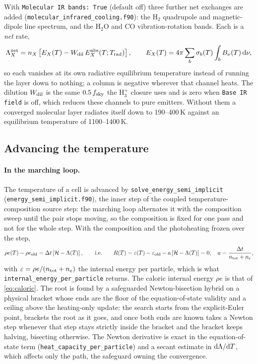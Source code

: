 With \texttt{Molecular IR bands: True} (default off) three further net
exchanges are added (\texttt{molecular\_infrared\_cooling.f90}): the H$_2$
quadrupole and magnetic-dipole line spectrum, and the H$_2$O and CO
vibration-rotation bands. Each is a \emph{net} rate,
\begin{equation}
\Lambda_X^{\rm net} = n_X\left[E_X(T)-W_{\rm dil}\,E_X^{\rm abs}(T;T_{\rm rad})\right],
\qquad
E_X(T) = 4\pi\sum_b\sigma_b(T)\int_b B_\nu(T)\,{\rm d}\nu,
\label{eq:th:molir}
\end{equation}
so each vanishes at its own radiative equilibrium temperature instead of
running the layer down to nothing; a column is negative wherever that channel
heats. The dilution $W_{\rm dil}$ is the same $0.5\,f_{\rm sky}$ the H$_3^+$ closure
uses and is zero when \texttt{Base IR field} is off, which reduces these
channels to pure emitters. Without them a converged molecular layer radiates
itself down to 190--400\,K against an equilibrium temperature of
1100--1400\,K.

\subsection{Advancing the temperature}
\label{sec:thermal:tsolve}

\paragraph{In the marching loop.} The temperature of a cell is advanced by
\texttt{solve\_energy\_semi\_implicit}
(\texttt{energy\_semi\_implicit.f90}), the inner step of the coupled
temperature-composition source step: the marching loop alternates it with
the composition sweep until the pair stops moving, so the composition is
fixed for one pass and not for the whole step. With the composition and the
photoheating frozen over the step,
\begin{equation}
\rho e(T)-\rho e_{\rm old} = \Delta t\left[\mathcal{H}-\Lambda(T)\right],
\qquad\text{i.e.}\qquad
R(T) = \varepsilon(T)-\varepsilon_{\rm old}
       -a\left[\mathcal{H}-\Lambda(T)\right] = 0,
\quad a = \frac{\Delta t}{n_{\rm tot}+n_e},
\label{eq:th:semiimplicit}
\end{equation}
with $\varepsilon = \rho e/(n_{\rm tot}+n_e)$ the internal energy per
particle, which is what \texttt{internal\_energy\_per\_particle} returns.
The caloric internal energy $\rho e$ is that of \eqref{eq:caloric}. The root is
found by a safeguarded Newton-bisection hybrid on a physical bracket whose
ends are the floor of the equation-of-state validity and a ceiling above the
heating-only update: the search starts from the explicit-Euler point,
brackets the root as it goes, and once both ends are known takes a Newton
step whenever that step stays strictly inside the bracket and the bracket
keeps halving, bisecting otherwise. The Newton derivative is exact in the
equation-of-state term (\texttt{heat\_capacity\_per\_particle}) and a secant
estimate in ${\rm d}\Lambda/{\rm d}T$, which affects only the path, the
safeguard owning the convergence.

